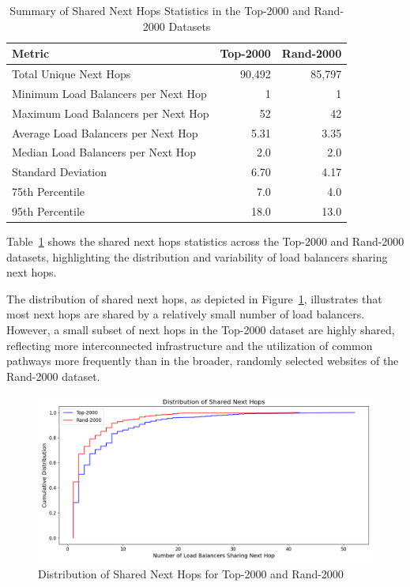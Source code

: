 \documentclass[12pt]{cwru_thesis}
\begin{document}
\begin{table}[h!]
    \centering
    \begin{tabular}{|l|r|r|}
        \hline
        \textbf{Metric} & \textbf{Top-2000} & \textbf{Rand-2000} \\
        \hline
        Total Unique Next Hops & 90,492 & 85,797 \\
        Minimum Load Balancers per Next Hop & 1 & 1 \\
        Maximum Load Balancers per Next Hop & 52 & 42 \\
        Average Load Balancers per Next Hop & 5.31 & 3.35 \\
        Median Load Balancers per Next Hop & 2.0 & 2.0 \\
        Standard Deviation & 6.70 & 4.17 \\
        75th Percentile & 7.0 & 4.0 \\
        95th Percentile & 18.0 & 13.0 \\
        \hline
    \end{tabular}
    \caption{Summary of Shared Next Hops Statistics in the Top-2000 and Rand-2000 Datasets}
    \label{tab:shared_next_hops_summary}
\end{table}

Table~\ref{tab:shared_next_hops_summary} shows the shared next hops statistics across the Top-2000 and Rand-2000 datasets, highlighting the distribution and variability of load balancers sharing next hops.



The distribution of shared next hops, as depicted in Figure~\ref{fig:shared_next_hops_combined}, illustrates that most next hops are shared by a relatively small number of load balancers. However, a small subset of next hops in the Top-2000 dataset are highly shared, reflecting more interconnected infrastructure and the utilization of common pathways more frequently than in the broader, randomly selected websites of the Rand-2000 dataset.


\begin{figure}[h!]
    \centering
    \includegraphics[width=\linewidth]{figures/shared_next_hops_combined.png}
    \caption{Distribution of Shared Next Hops for Top-2000 and Rand-2000}
    \label{fig:shared_next_hops_combined}
\end{figure}
\end{document}
